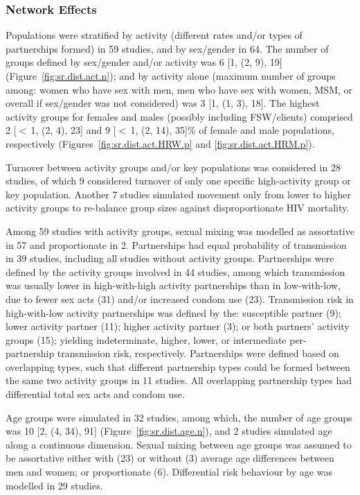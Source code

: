 \subsubsection{Network Effects}\label{sr.res.factors.net}
Populations were stratified by activity (different rates and/or types of partnerships formed)
in 59 studies, and by sex/gender in 64.
The number of groups defined by sex/gender and/or activity was 6 [1, (2, 9), 19] (Figure~\ref{fig:sr.dist.act.n});
and by activity alone (maximum number of groups among:
women who have sex with men, men who have sex with women,
MSM, or overall if sex/gender was not considered) was 3 [1, (1, 3), 18].
The highest activity groups for females and males (possibly including FSW/clients) comprised
2 [$<$\,1, (2, 4), 23] and 9 [$<$\,1, (2, 14), 35]\% of female and male populations, respectively
(Figures~\ref{fig:sr.dist.act.HRW.p} and \ref{fig:sr.dist.act.HRM.p}).
\par
Turnover between activity groups and/or key populations was considered in 28 studies,
of which 9 considered turnover of only one specific high-activity group or key population.
Another 7 studies simulated movement only from lower to higher activity groups
to re-balance group sizes against disproportionate HIV mortality.
\par
Among 59 studies with activity groups, sexual mixing was modelled as
assortative in 57 and proportionate in 2.
Partnerships had equal probability of transmission in 39 studies,
including all studies without activity groups.
Partnerships were defined by the activity groups involved in 44 studies,
among which transmission was usually
lower in high-with-high activity partnerships than in low-with-low, due to
fewer sex acts (31) and/or increased condom use (23).
Transmission risk in high-with-low activity partnerships was defined by the:
susceptible partner (9);
lower activity partner (11);
higher activity partner (3); or
both partners' activity groups (15); yielding
indeterminate, higher, lower, or intermediate per-partnership transmission risk, respectively.
Partnerships were defined based on overlapping types, such that
different partnership types could be formed between the same two activity groups in 11 studies.
All overlapping partnership types had differential total sex acts and condom use.
\par
Age groups were simulated in 32 studies, among which,
the number of age groups was 10 [2, (4, 34), 91] (Figure~\ref{fig:sr.dist.age.n}),
and 2 studies simulated age along a continuous dimension.
Sexual mixing between age groups was assumed to be assortative
either with (23) or without (3) average age differences between men and women;
or proportionate (6).
Differential risk behaviour by age was modelled in 29 studies.
